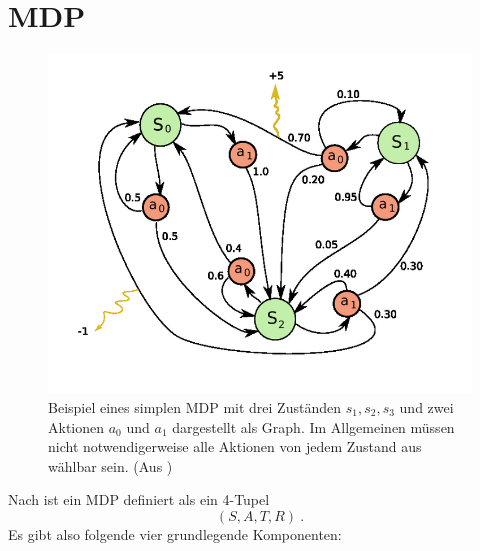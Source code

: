 \documentclass[a4paper]{IEEEtran}
\begin{document}
\section{MDP}
\begin{figure}[ht]
	\centering
	\includegraphics[scale=0.42]{images/MDP_example.png}
	\caption{Beispiel eines simplen MDP mit drei Zuständen $s_1, s_2, s_3$ und zwei Aktionen $a_0$ und $a_1$ dargestellt als Graph. Im Allgemeinen müssen nicht notwendigerweise alle Aktionen von jedem Zustand aus wählbar sein. (Aus \cite{mistWitz_MDPexample})}
	\label{fig:MDP_example} %
\end{figure}
Nach \cite{cassandra1995acting} ist ein MDP definiert als ein 4-Tupel
\begin{equation}
	(S, A, T, R) \ .
\end{equation}
Es gibt also folgende vier grundlegende Komponenten:
\end{document}
